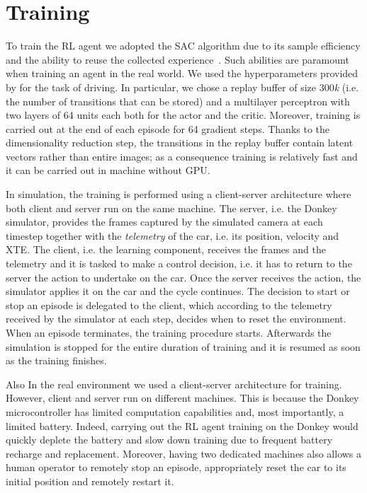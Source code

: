 \section{Training}

To train the RL agent we adopted the SAC algorithm due to its sample efficiency and the ability to reuse the collected experience~\cite{art:sac}. Such abilities are paramount when training an agent in the real world. We used the hyperparameters provided by \cite{learning-to-drive-in-5-minutes} for the task of driving. In particular, we chose a replay buffer of size $300$\textit{k} (i.e. the number of transitions that can be stored) and a multilayer perceptron with two layers of 64 units each both for the actor and the critic. Moreover, training is carried out at the end of each episode for 64 gradient steps.  Thanks to the dimensionality reduction step, the transitions in the replay buffer contain latent vectors rather than entire images; as a consequence training is relatively fast and it can be carried out in machine without GPU. 

In simulation, the training is performed using a client-server architecture where both client and server run on the same machine. The server, i.e. the Donkey simulator, provides the frames captured by the simulated camera at each timestep together with the \textit{telemetry} of the car, i.e. its position, velocity and XTE. The client, i.e. the learning component, receives the frames and the telemetry and it is tasked to make a control decision, i.e. it has to return to the server the action to undertake on the car. Once the server receives the action, the simulator applies it on the car and the cycle continues. The decision to start or stop an episode is delegated to the client, which according to the telemetry received by the simulator at each step, decides when to reset the environment. When an episode terminates, the training procedure starts. Afterwards the simulation is stopped for the entire duration of training and it is resumed as soon as the training finishes.

Also In the real environment we used a client-server architecture for training. However, client and server run on different machines. This is because the Donkey microcontroller has limited computation capabilities and, most importantly, a limited battery. Indeed, carrying out the RL agent training on the Donkey would quickly deplete the battery and slow down training due to frequent battery recharge and replacement. Moreover, having two dedicated machines also allows a human operator to remotely stop an episode, appropriately reset the car to its initial position and remotely restart it.


